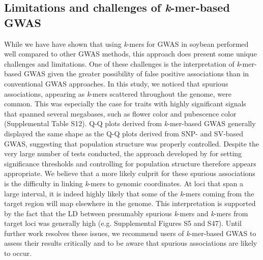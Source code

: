 \documentclass{article}
\begin{document}
\subsection*{Limitations and challenges of \emph{k}-mer-based GWAS}

While we have have shown that using \emph{k}-mers for GWAS in soybean performed
well compared to other GWAS methods, this approach does present some unique
challenges and limitations. One of these challenges is the
interpretation of \textit{k}-mer-based GWAS given the greater possibility
of false positive associations than in conventional GWAS approaches. In this
study, we noticed that spurious associations, appearing as \textit{k}-mers
scattered throughout the genome, were common. This was especially the case for
traits with highly significant signals that spanned several megabases, such as flower color
and pubescence color (Supplemental Table S12). Q-Q plots derived from \textit{k}-mer-based GWAS
generally displayed the same shape as the Q-Q plots derived from SNP-
and SV-based GWAS, suggesting that population structure was properly controlled.
Despite the very large number of tests conducted, the approach developed by
 for setting significance thresholds and controlling
for population structure therefore appears appropriate.
We believe that a more likely culprit for these spurious associations is the
difficulty in linking \textit{k}-mers to genomic coordinates. At loci that
span a large interval, it is indeed highly likely that some of the \textit{k}-mers
coming from the target region will map elsewhere in the genome. This interpretation is supported
by the fact that the LD between presumably spurious \textit{k}-mers and
\textit{k}-mers from target loci was generally high (e.g. Supplemental Figures S5 and S47).
Until further work resolves these issues, we recommend users of
\textit{k}-mer-based GWAS to assess their results critically and to be aware
that spurious associations are likely to occur.
\end{document}
